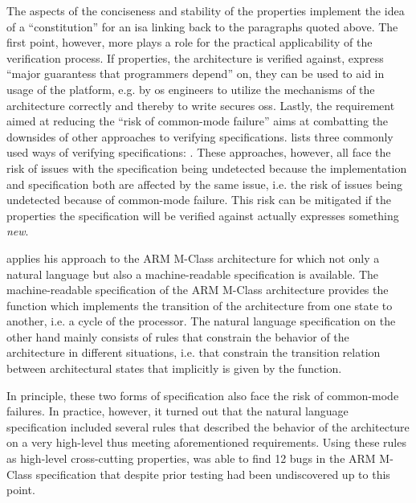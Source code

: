 The aspects of the conciseness and stability of the properties implement the idea of a \enquote{constitution} for an \gls{isa} linking back to the paragraphs quoted above.
The first point, however, more plays a role for the practical applicability of the verification process.
If properties, the architecture is verified against, express \enquote{major guarantess that programmers  depend} on, they can be used to aid in usage of the platform, e.g. by \gls{os} engineers to utilize the mechanisms of the architecture correctly and thereby to write secures \glspl{os}.
Lastly, the requirement aimed at reducing the \enquote{risk of common-mode failure} aims at combatting the downsides of other approaches to verifying specifications.
\citeauthor{Reid17} lists three commonly used ways of verifying specifications: .
These approaches, however, all face the risk of issues with the specification being undetected because the implementation and specification both are affected by the same issue, i.e. the risk of issues being undetected because of common-mode failure.
This risk can be mitigated if the properties the specification will be verified against actually expresses something \textit{new}.

\citeauthor{Reid17} applies his approach to the ARM M-Class architecture for which not only a natural language but also a machine-readable specification is available.
The machine-readable specification of the ARM M-Class architecture provides the function  which implements the transition of the architecture from one state to another, i.e. a cycle of the processor.
The natural language specification on the other hand mainly consists of rules that constrain the behavior of the architecture in different situations, i.e. that constrain the transition relation between architectural states that implicitly is given by the  function.

In principle, these two forms of specification also face the risk of common-mode failures.
In practice, however, it turned out that the natural language specification included several rules that described the behavior of the architecture on a very high-level thus meeting aforementioned requirements.
Using these rules as high-level cross-cutting properties, \citeauthor{Reid17} was able to find 12 bugs in the ARM M-Class specification that despite prior testing had been undiscovered up to this point.

